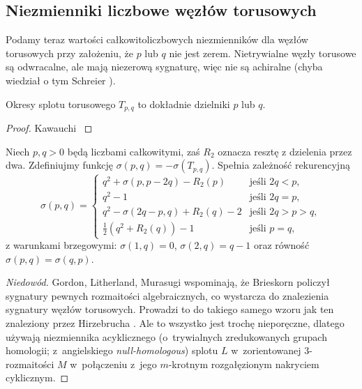 
\subsection{Niezmienniki liczbowe węzłów torusowych}
Podamy teraz wartości całkowitoliczbowych niezmienników dla węzłów torusowych przy założeniu, że $p$ lub $q$ nie jest zerem.
Nietrywialne węzły torusowe są odwracalne, ale mają niezerową sygnaturę, więc nie są achiralne (chyba wiedział o tym Schreier \cite{schreier24}).

\begin{proposition}
%
    Okresy splotu torusowego $T_{p, q}$ to dokładnie dzielniki $p$ lub $q$.
\end{proposition}

\begin{proof}
    Kawauchi \cite[ćw 10.1.9]{kawauchi96}
\end{proof}

\begin{proposition}
%
    Niech $p, q > 0$ będą liczbami całkowitymi, zaś $R_2$ oznacza resztę z dzielenia przez dwa.
    Zdefiniujmy funkcję $\sigma(p, q) = - \sigma(T_{p, q})$.
    Spełnia zależność rekurencyjną
    \begin{equation}
        \sigma(p, q) = \begin{cases}
             q^2 + \sigma(p, p - 2q) - R_2(p)       & \text{jeśli } 2q < p, \\
             q^2 - 1                              & \text{jeśli } 2q = p, \\
             q^2 - \sigma(2q - p, q) + R_2(q) - 2 & \text{jeśli } 2q > p > q, \\
             \frac 12 (q^2 + R_2(q)) - 1                 & \text{jeśli } p = q,
        \end{cases}
    \end{equation}
    z warunkami brzegowymi: $\sigma(1, q) = 0$, $\sigma(2, q) = q-1$ oraz równość $\sigma(p, q) = \sigma(q, p)$.
\end{proposition}

\begin{proof}[Niedowód]
%
%
%
%
%
    Gordon, Litherland, Murasugi \cite[tw. 5.2]{litherland81} wspominają, że Brieskorn \cite{brieskorn66} policzył sygnatury pewnych rozmaitości algebraicznych, co wystarcza do znalezienia sygnatury węzłów torusowych.
    Prowadzi to do takiego samego wzoru jak ten znaleziony przez Hirzebrucha \cite{hirzebruch68}.
    Ale to wszystko jest trochę nieporęczne, dlatego używają niezmiennika acyklicznego (o~trywialnych zredukowanych grupach homologii; z~angielskiego \emph{null-homologous}) splotu $L$ w~zorientowanej 3-rozmaitości $M$ w~połączeniu z~jego $m$-krotnym rozgałęzionym nakryciem cyklicznym.
%
\end{proof}

